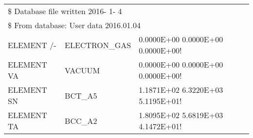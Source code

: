 
\begin{table}[H]
	\centering
	\begin{tabular}{ l l l }
		\hline
		\multicolumn{3}{l}{\$ Database file written 2016- 1- 4}\\
		\multicolumn{3}{l}{\$ From database: User data 2016.01.04} \\
		ELEMENT /- & ELECTRON\_GAS & 0.0000E+00  0.0000E+00  0.0000E+00!
\\
		ELEMENT VA & VACUUM & 0.0000E+00  0.0000E+00  0.0000E+00!\\
		ELEMENT SN & BCT\_A5 & 1.1871E+02  6.3220E+03  5.1195E+01!\\
		ELEMENT TA & BCC\_A2 & 1.8095E+02  5.6819E+03  4.1472E+01!\\
	\end{tabular}
	\label{ab-table:snta}
\end{table}

